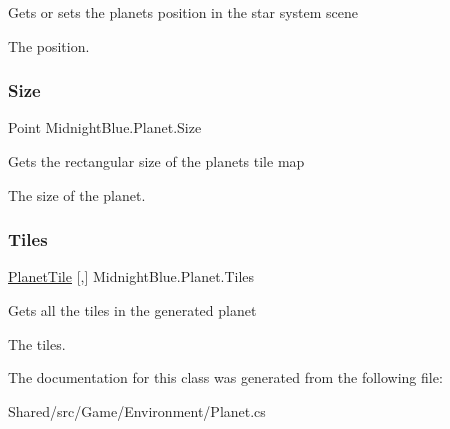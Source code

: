 Gets or sets the planets position in the star system scene 

The position.\hypertarget{class_midnight_blue_1_1_planet_a10c69ed4de9c28b2e61848e3bb89c377}{}\label{class_midnight_blue_1_1_planet_a10c69ed4de9c28b2e61848e3bb89c377} 
\subsubsection{\texorpdfstring{Size}{Size}}
{\footnotesize\ttfamily Point Midnight\+Blue.\+Planet.\+Size\hspace{0.3cm}{\ttfamily [get]}}



Gets the rectangular size of the planets tile map 

The size of the planet.\hypertarget{class_midnight_blue_1_1_planet_a3e78bf28456cdfd2576b68e3ef106fc7}{}\label{class_midnight_blue_1_1_planet_a3e78bf28456cdfd2576b68e3ef106fc7} 
\subsubsection{\texorpdfstring{Tiles}{Tiles}}
{\footnotesize\ttfamily \hyperlink{class_midnight_blue_1_1_planet_tile}{Planet\+Tile} \mbox{[},\mbox{]} Midnight\+Blue.\+Planet.\+Tiles\hspace{0.3cm}{\ttfamily [get]}}



Gets all the tiles in the generated planet 

The tiles.

The documentation for this class was generated from the following file\+:\begin{DoxyCompactItemize}
\item 
Shared/src/\+Game/\+Environment/Planet.\+cs\end{DoxyCompactItemize}
